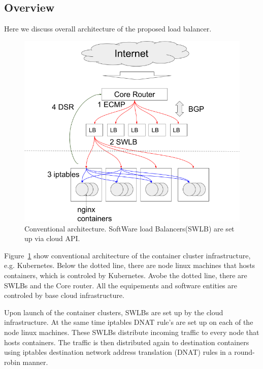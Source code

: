 \subsection{Overview}\label{Network}
Here we discuss overall architecture of the proposed load balancer.
\begin{figure}
\includegraphics[width=\columnwidth]{Figs/google_lb}
\caption{Conventional architecture. SoftWare load Balancers(SWLB) are set up via cloud API. }
\label{fig:google_lb}
\end{figure}
Figure~\ref{fig:google_lb} show conventional architecture of the container cluster infrastructure, e.g. Kubernetes.
Below the dotted line, there are node linux machines that hosts containers, which is controled by Kubernetes.
Avobe the dotted line, there are SWLBs and the Core router.
All the equipements and software entities are controled by base cloud infrastructure.

Upon launch of the container clusters, SWLBs are set up by the cloud infrastructure.
At the same time iptables DNAT rule's are set up on each of the node linux machines.
These SWLBs distribute incoming traffic to every node that hosts containers.
The traffic is then distributed again to destination containers using iptables destination 
network address translation (DNAT)\cite{MartinA.Brown2017,Marmol2015} rules in a round-robin manner. 

